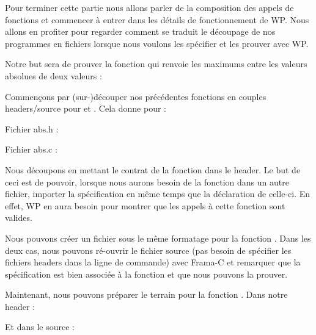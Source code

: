 Pour terminer cette partie nous allons parler de la composition des appels de
fonctions et commencer à entrer dans les détails de fonctionnement de WP. Nous
allons en profiter pour regarder comment se traduit le découpage de nos 
programmes en fichiers lorsque nous voulons les spécifier et les prouver avec WP.



Notre but sera de prouver la fonction  qui renvoie les maximums 
entre les valeurs absolues de deux valeurs :






Commençons par (sur-)découper nos précédentes fonctions en couples 
headers/source pour  et . Cela donne pour  :



Fichier abs.h :



Fichier abs.c :




Nous découpons en mettant le contrat de la fonction dans le header. Le but de
ceci est de pouvoir, lorsque nous aurons besoin de la fonction dans un autre 
fichier, importer la spécification en même temps que la déclaration de 
celle-ci. En effet, WP en aura besoin pour montrer que les appels à cette 
fonction sont valides.



Nous pouvons créer un fichier sous le même formatage pour la fonction .
Dans les deux cas, nous pouvons ré-ouvrir le fichier source (pas besoin de 
spécifier les fichiers headers dans la ligne de commande) avec Frama-C et 
remarquer que la spécification est bien associée à la fonction et que nous
pouvons la prouver.



Maintenant, nous pouvons préparer le terrain pour la fonction . 
Dans notre header :






Et dans le source :






